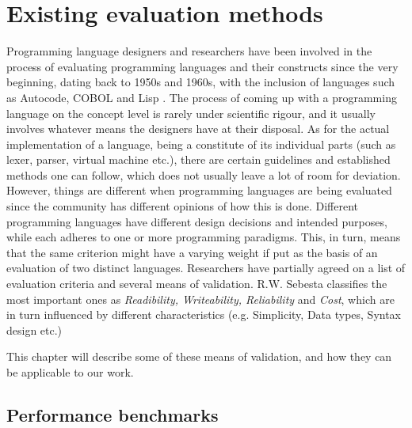 \chapter{Existing evaluation methods}
\label{chap:eval_methods}

Programming language designers and researchers have been involved in the process of evaluating programming languages and their constructs since the very beginning, dating back to 1950s and 1960s, with the inclusion of languages such as Autocode, COBOL and Lisp \cite{PLHistory}. The process of coming up with a programming language on the concept level is rarely under scientific rigour, and it usually involves whatever means the designers have at their disposal. As for the actual implementation of a language, being a constitute of its individual parts (such as lexer, parser, virtual machine etc.), there are certain guidelines and established methods one can follow, which does not usually leave a lot of room for deviation. However, things are different when programming languages are being evaluated since the community has different opinions of how this is done. Different programming languages have different design decisions and intended purposes, while each adheres to one or more programming paradigms. This, in turn, means that the same criterion might have a varying weight if put as the basis of an evaluation of two distinct languages. Researchers have partially agreed on a list of evaluation criteria and several means of validation. R.W. Sebesta \cite{Sebesta} classifies the most important ones as \textit{Readibility, Writeability, Reliability} and \textit{Cost}, which are in turn influenced by different characteristics (e.g. Simplicity, Data types, Syntax design etc.)

This chapter will describe some of these means of validation, and how they can be applicable to our work.

\section{Performance benchmarks}

